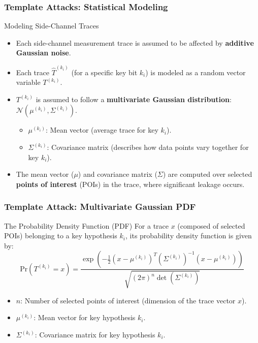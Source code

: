 \begin{frame}
    \frametitle{Template Attacks: Statistical Modeling} %
    \begin{block}{Modeling Side-Channel Traces}
        \begin{itemize}
            \item Each side-channel measurement trace is assumed to be affected by \textbf{additive Gaussian noise}.
            \item Each trace $\hat{T}^{(k_i)}$ (for a specific key bit $k_i$) is modeled as a random vector variable $T^{(k_i)}$.
            \item $T^{(k_i)}$ is assumed to follow a \textbf{multivariate Gaussian distribution}: $\mathcal{N}(\mu^{(k_i)}, \Sigma^{(k_i)})$.
                \begin{itemize}
                    \item $\mu^{(k_i)}$: Mean vector (average trace for key $k_i$).
                    \item $\Sigma^{(k_i)}$: Covariance matrix (describes how data points vary together for key $k_i$).
                \end{itemize}
            \item The mean vector ($\mu$) and covariance matrix ($\Sigma$) are computed over selected \textbf{points of interest} (POIs) in the trace, where significant leakage occurs.
        \end{itemize}
    \end{block}
\end{frame}

\begin{frame}
    \frametitle{Template Attack: Multivariate Gaussian PDF}
    \begin{block}{The Probability Density Function (PDF)}
        For a trace $x$ (composed of selected POIs) belonging to a key hypothesis $k_i$, its probability density function is given by:
        $$
        \text{Pr}(T^{(k_i)}=x) = \frac{\exp\left(-\frac{1}{2}(x-\mu^{(k_i)})^T(\Sigma^{(k_i)})^{-1}(x-\mu^{(k_i)})\right)}{\sqrt{(2\pi)^n \det(\Sigma^{(k_i)})}}
        $$
        \begin{itemize}
            \item $n$: Number of selected points of interest (dimension of the trace vector $x$).
            \item $\mu^{(k_i)}$: Mean vector for key hypothesis $k_i$.
            \item $\Sigma^{(k_i)}$: Covariance matrix for key hypothesis $k_i$.
        \end{itemize}
    \end{block}
\end{frame}

